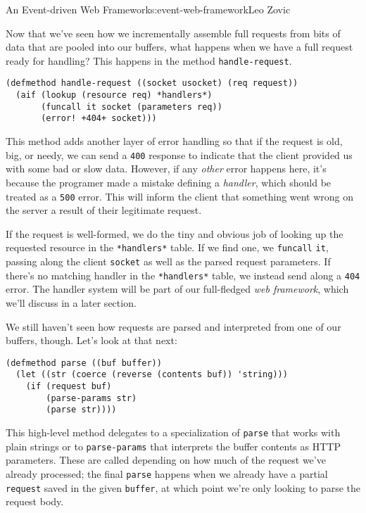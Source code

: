 \begin{aosachapter}{An Event-driven Web Framework}{s:event-web-framework}{Leo Zovic}
\label{interpreting-requests}

\label{sec.eventsweb.handlerfunc} Now that we've seen how we
incrementally assemble full requests from bits of data that are pooled
into our buffers, what happens when we have a full request ready for
handling? This happens in the method \texttt{handle-request}.

\begin{verbatim}
(defmethod handle-request ((socket usocket) (req request))
  (aif (lookup (resource req) *handlers*)
       (funcall it socket (parameters req))
       (error! +404+ socket)))
\end{verbatim}

This method adds another layer of error handling so that if the request
is old, big, or needy, we can send a \texttt{400} response to indicate
that the client provided us with some bad or slow data. However, if any
\emph{other} error happens here, it's because the programer made a
mistake defining a \emph{handler}, which should be treated as a
\texttt{500} error. This will inform the client that something went
wrong on the server a result of their legitimate request.

If the request is well-formed, we do the tiny and obvious job of looking
up the requested resource in the \texttt{*handlers*} table. If we find
one, we \texttt{funcall} \texttt{it}, passing along the client
\texttt{socket} as well as the parsed request parameters. If there's no
matching handler in the \texttt{*handlers*} table, we instead send along
a \texttt{404} error. The handler system will be part of our
full-fledged \emph{web framework}, which we'll discuss in a later
section.

We still haven't seen how requests are parsed and interpreted from one
of our buffers, though. Let's look at that next:

\begin{verbatim}
(defmethod parse ((buf buffer))
  (let ((str (coerce (reverse (contents buf)) 'string)))
    (if (request buf)
        (parse-params str)
        (parse str))))
\end{verbatim}

This high-level method delegates to a specialization of \texttt{parse}
that works with plain strings or to \texttt{parse-params} that
interprets the buffer contents as HTTP parameters. These are called
depending on how much of the request we've already processed; the final
\texttt{parse} happens when we already have a partial \texttt{request}
saved in the given \texttt{buffer}, at which point we're only looking to
parse the request body.


\end{aosachapter}
